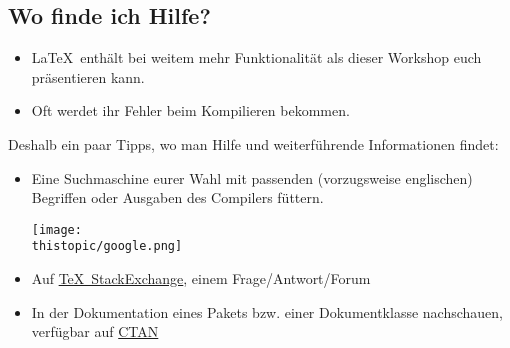 \subsection{Wo finde ich Hilfe?}

\begin{frame}{\subsecname}
    \begin{itemize}
        \item \LaTeX\ enthält bei weitem mehr Funktionalität als dieser Workshop euch präsentieren
            kann.
        \item Oft werdet ihr Fehler beim Kompilieren bekommen.
    \end{itemize}
    Deshalb ein paar Tipps, wo man Hilfe und weiterführende Informationen findet:
    \begin{itemize}
        \item Eine \alert{Suchmaschine} eurer Wahl mit passenden (vorzugsweise englischen) Begriffen
            oder Ausgaben des Compilers füttern.
            \begin{center}
                \texttt{[image: \\thistopic/google.png]}
            \end{center}
        \item Auf \href{https://tex.stackexchange.com}{\alert{\TeX~StackExchange}}, einem
            Frage\-/Antwort\-/Forum
        \item In der \alert{Dokumentation} eines Pakets bzw. einer Dokumentklasse nachschauen,
            verfügbar auf \href{https://ctan.org}{CTAN}
    \end{itemize}
\end{frame}
